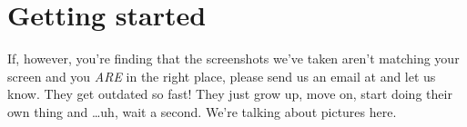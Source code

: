 \section{Getting started}
\genHeader 

If, however, you're finding that the screenshots we've taken aren't matching your screen and you \emph{ARE} in the right place, please send us an email at
\eMoflonContact{} and let us know. They get outdated so fast! They just grow up, move on, start doing their own thing and
\ldots uh, wait a second. We're talking about pictures here.